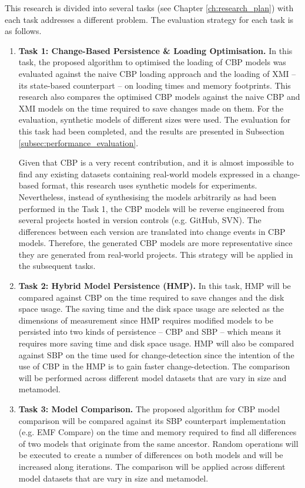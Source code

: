 \documentclass[12pt, a4paper]{report} \usepackage[titletoc]{appendix}
\begin{document}
This research is divided into several tasks (see Chapter \ref{ch:research_plan}) with each task addresses a different problem. The evaluation strategy for each task is as follows. 
\begin{enumerate}
	\item \textbf{Task 1: Change-Based Persistence \& Loading Optimisation.} In this task, the proposed algorithm to optimised the loading of CBP models was evaluated against the naive CBP loading approach and the loading of XMI -- its state-based counterpart -- on loading times and memory footprints. This research also compares the optimised CBP models against the naive CBP and XMI models on the time required to save changes made on them. For the evaluation, synthetic models of different sizes were used. The evaluation for this task had been completed, and the results are presented in Subsection \ref{subsec:performance_evaluation}.
	
	Given that CBP is a very recent contribution, and it is almost impossible to find any existing datasets containing real-world models expressed in a change-based format, this research uses synthetic models for experiments. Nevertheless, instead of synthesising the models arbitrarily as had been performed in the Task 1, the CBP models will be reverse engineered from several projects hosted in version controls (e.g. GitHub, SVN). The differences between each version are translated into change events in CBP models. Therefore, the generated CBP models are more representative since they are generated from real-world projects. This strategy will be applied in the subsequent tasks.
	
	\item \textbf{Task 2: Hybrid Model Persistence (HMP).} In this task, HMP will be compared against CBP on the time required to save changes and the disk space usage. The saving time and the disk space usage are selected as the dimensions of measurement since HMP requires modified models to be persisted into two kinds of persistence -- CBP and SBP -- which means it requires more saving time and disk space usage. HMP will also be compared against SBP on the time used for change-detection since the intention of the use of CBP in the HMP is to gain faster change-detection. The comparison will be performed across different model datasets that are vary in size and metamodel.
	
	\item \textbf{Task 3: Model Comparison.} The proposed algorithm for CBP model comparison will be compared against its SBP counterpart implementation (e.g. EMF Compare) on the time and memory required to find all differences of two models that originate from the same ancestor. Random operations will be executed to create a number of differences on both models and will be increased along iterations. The comparison will be applied across different model datasets that are vary in size and metamodel.   
	

\end{enumerate}
\end{document}
